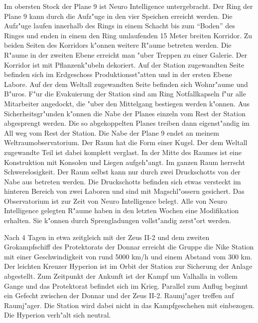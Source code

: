 Im obersten Stock der Plane 9 ist Neuro Intelligence untergebracht. Der Ring der Plane 9 kann durch die Aufz"uge in den vier Speichen erreicht werden. Die Aufz"uge laufen innerhalb des Rings in einem Schacht bis zum "`Boden"' des Ringes und enden in einem den Ring umlaufenden 15 Meter breiten Korridor. Zu beiden Seiten des Korridors k"onnen weitere R"aume betreten werden. Die R"aume in der zweiten Ebene erreicht man "uber Treppen zu einer Galerie. Der Korridor ist mit Pflanzenk"ubeln dekoriert. Auf der Station zugewandten Seite befinden sich im Erdgeschoss Produktionsst"atten und in der ersten Ebene Labore. Auf der dem Weltall zugewandten Seite befinden sich Wohnr"aume und B"uros. F"ur die Evakuierung der Station sind am Ring Notfallkapseln f"ur alle Mitarbeiter angedockt, die "uber den Mittelgang bestiegen werden k"onnen. Aus Sicherheitsgr"unden k"onnen die Nabe der Planes einzeln vom Rest der Station abgesprengt werden. Die so abgekoppelten Planes treiben dann eigenst"andig im All weg vom Rest der Station. Die Nabe der Plane 9 endet an meinem Weltraumobservatorium. Der Raum hat die Form einer Kugel. Der dem Weltall zugewandte Teil ist dabei komplett verglast. In der Mitte des Raumes ist eine Konstruktion mit Konsolen und Liegen aufgeh"angt. Im ganzen Raum herrscht Schwerelosigkeit. Der Raum selbst kann nur durch zwei Druckschotts von der Nabe aus betreten werden. Die Druckschotts befinden sich etwas versteckt im hinteren Bereich von zwei Laboren und sind mit Magschl"ossern gesichert. Das Observatorium ist zur Zeit von Neuro Intelligence belegt. Alle von Neuro Intelligence gelegten R"aume haben in den letzten Wochen eine Modifikation erhalten. Sie k"onnen durch Sprengladungen vollst"andig zerst"ort werden.



Nach 4 Tagen in etwa zeitgleich mit der Zeus II-2 und dem zweiten Gro\3kampfschiff des Protektorats der Donnar erreicht die Gruppe die Nike Station mit einer Geschwindigkeit von rund 5000 km/h und einem Abstand vom 300 km. Der leichten Kreuzer Hyperion ist im Orbit der Station zur Sicherung der Anlage abgestellt. Zum Zeitpunkt der Ankunft ist der Kampf um Valhalla in vollem Gange und das Protektorat befindet sich im Krieg. Parallel zum Anflug beginnt ein Gefecht zwischen der Donnar und der Zeus II-2. Raumj"ager treffen auf Raumj"ager. Die Station wird dabei nicht in das Kampfgeschehen mit einbezogen. Die Hyperion verh"alt sich neutral.

